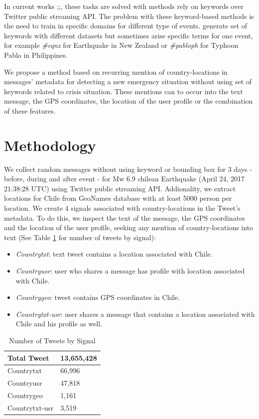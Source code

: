 \documentclass[letterpaper]{article} %
\begin{document}
In current works \cite{kumar2011};\cite{ashktorab2014tweedr};\cite{imranaidr2014}, these tasks are solved with methods rely on keywords over Twitter public streaming API. The problem with these keyword-based methods is the need to train in specific domains for different type of events.\cite{olteanu2014} generate set of keywords with different datasets but sometimes arise specific terms for one event, for example \textit{\#eqnz} for Earthquake in New Zealand or \textit{\#pabloph} for Typhoon Pablo in Philippines.

We propose a method based on recurring mention of country-locations in messages' metadata for detecting a new emergency situation without using set of keywords related to crisis situation. These mentions can to occur into the text message, the GPS coordinates, the location of the user profile or the combination of these features.


\section{Methodology}

We collect random messages without using keyword or bounding box for 3 days - before, during and after event - for Mw 6.9 chilean Earthquake (April 24, 2017 21:38:28 UTC) using Twitter public streaming API. Addionality, we extract locations for Chile from GeoNames database with at least 5000 person per location. We create 4 signals associated with country-locations in the Tweet's metadata. To do this, we inspect the text of the message, the GPS coordinates and the location of the user profile, seeking any mention of country-locations into text (See Table \ref{signalsTweets} for number of tweets by signal):

\begin{itemize}
	\item \textit{Countrytxt}: text tweet contains a location associated with Chile.
	\item \textit{Countryusr}: user who shares a message has profile with location associated with Chile.
	\item \textit{Countrygeo}: tweet contains GPS coordinates in Chile.
	\item \textit{Countrytxt-usr}: user shares a message that contains a location associated with Chile and his profile as well.
\end{itemize}

\begin{table}[]
	\centering
	\begin{tabular}{|l|l|}
		\hline
		Total Tweet    & 13,655,428 \\ \hline
		Countrytxt     & 66,996     \\ \hline
		Countryusr     & 47,818     \\ \hline
		Countrygeo     & 1,161      \\ \hline
		Countrytxt-usr & 3,519      \\ \hline
	\end{tabular}
	\caption{Number of Tweets by Signal}
	\label{signalsTweets}
\end{table}
\end{document}
